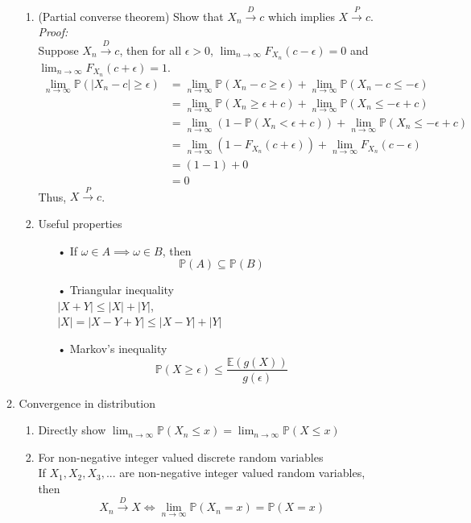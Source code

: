 \documentclass[11pt]{article}
\begin{document}
\begin{enumerate}
\begin{enumerate}
\begin{enumerate}
\item{(Partial converse theorem) Show that $X_{n} \xrightarrow{D} c$ which implies $X \xrightarrow{P} c$}.\\
\textit{Proof:}\\
Suppose $X_{n} \xrightarrow{D} c$, then for all $\epsilon >0$, $\lim_{n \to \infty} F_{X_n}(c - \epsilon) = 0$ and $\lim_{n \to \infty} F_{X_n}(c + \epsilon) = 1$.
\begin{align*}
\lim_{n \to \infty} \mathbb{P}(|X_{n} - c| \geq \epsilon) &= \lim_{n \to \infty} \mathbb{P}(X_{n} - c \geq \epsilon) + \lim_{n \to \infty}\mathbb{P}(X_{n} - c \leq -\epsilon)\\
&= \lim_{n \to \infty} \mathbb{P}(X_{n} \geq \epsilon + c) + \lim_{n \to \infty} \mathbb{P}(X_{n} \leq -\epsilon +c)\\
&= \lim_{n \to \infty} (1 - \mathbb{P}(X_{n} < \epsilon + c)) + \lim_{n \to \infty} \mathbb{P}(X_{n} \leq -\epsilon +c)\\
&= \lim_{n \to \infty} (1 - F_{X_n}(c + \epsilon)) + \lim_{n \to \infty} F_{X_n}(c - \epsilon)\\
&= (1 -1) +0\\
&= 0
\end{align*}
Thus, $X \xrightarrow{P} c$.
\item{Useful properties}
\begin{enumerate}
\item[•]{If $\omega \in A \implies \omega \in B$, then}
$$\mathbb{P}(A) \subseteq \mathbb{P}(B)$$
\item[•]{Triangular inequality}\\
$|X+Y| \leq |X| + |Y|$, \\$|X|= |X-Y+Y| \leq |X-Y|+|Y|$
\item[•]{Markov's inequality}\\
$$\mathbb{P}(X \geq \epsilon) \leq \dfrac{\mathbb{E}(g(X))}{g(\epsilon)}$$
\end{enumerate}
\end{enumerate}
\item{Convergence in distribution}
\begin{enumerate}
\item{Directly show $\lim_{n \to \infty} \mathbb{P}(X_{n} \leq x) = \lim_{n \to \infty} \mathbb{P}(X \leq x)$}
\item{For non-negative integer valued discrete random variables}\\
If $X_{1}, X_{2}, X_{3}, ...$ are non-negative integer valued random variables, then $$X_{n} \xrightarrow{D} X \iff \lim_{n \to \infty} \mathbb{P}(X_{n} = x) = \mathbb{P}(X = x)$$

\end{enumerate}
\end{enumerate}
\end{enumerate}
\end{document}
